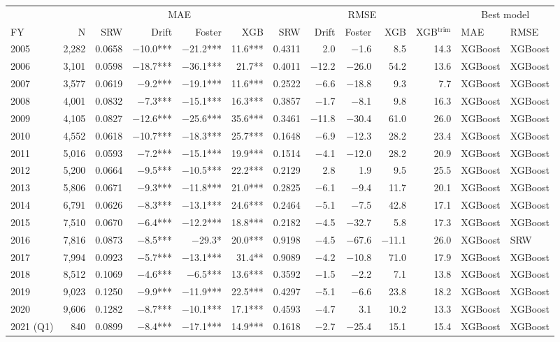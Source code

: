 \begin{tabular}{lrr rrr r rrr r ll}
\toprule
& & \multicolumn{4}{c}{MAE} & \multicolumn{5}{c}{RMSE} & \multicolumn{2}{c}{Best model} \\
\cmidrule(lr){3-6}\cmidrule(lr){7-11}\cmidrule(lr){12-13}
FY & N & SRW & Drift & Foster & XGB & SRW & Drift & Foster & XGB & XGB$^{\text{trim}}$ & MAE & RMSE \\
\midrule
2005 & 2,282 & 0.0658 & $-$10.0*** & $-$21.2*** & 11.6*** & 0.4311 & 2.0 & $-$1.6 & 8.5 & 14.3 & XGBoost & XGBoost \\
2006 & 3,101 & 0.0598 & $-$18.7*** & $-$36.1*** & 21.7** & 0.4011 & $-$12.2 & $-$26.0 & 54.2 & 13.6 & XGBoost & XGBoost \\
2007 & 3,577 & 0.0619 & $-$9.2*** & $-$19.1*** & 11.6*** & 0.2522 & $-$6.6 & $-$18.8 & 9.3 & 7.7 & XGBoost & XGBoost \\
2008 & 4,001 & 0.0832 & $-$7.3*** & $-$15.1*** & 16.3*** & 0.3857 & $-$1.7 & $-$8.1 & 9.8 & 16.3 & XGBoost & XGBoost \\
2009 & 4,105 & 0.0827 & $-$12.6*** & $-$25.6*** & 35.6*** & 0.3461 & $-$11.8 & $-$30.4 & 61.0 & 26.0 & XGBoost & XGBoost \\
2010 & 4,552 & 0.0618 & $-$10.7*** & $-$18.3*** & 25.7*** & 0.1648 & $-$6.9 & $-$12.3 & 28.2 & 23.4 & XGBoost & XGBoost \\
2011 & 5,016 & 0.0593 & $-$7.2*** & $-$15.1*** & 19.9*** & 0.1514 & $-$4.1 & $-$12.0 & 28.2 & 20.9 & XGBoost & XGBoost \\
2012 & 5,200 & 0.0664 & $-$9.5*** & $-$10.5*** & 22.2*** & 0.2129 & 2.8 & 1.9 & 9.5 & 25.5 & XGBoost & XGBoost \\
2013 & 5,806 & 0.0671 & $-$9.3*** & $-$11.8*** & 21.0*** & 0.2825 & $-$6.1 & $-$9.4 & 11.7 & 20.1 & XGBoost & XGBoost \\
2014 & 6,791 & 0.0626 & $-$8.3*** & $-$13.1*** & 24.6*** & 0.2464 & $-$5.1 & $-$7.5 & 42.8 & 17.1 & XGBoost & XGBoost \\
2015 & 7,510 & 0.0670 & $-$6.4*** & $-$12.2*** & 18.8*** & 0.2182 & $-$4.5 & $-$32.7 & 5.8 & 17.3 & XGBoost & XGBoost \\
2016 & 7,816 & 0.0873 & $-$8.5*** & $-$29.3* & 20.0*** & 0.9198 & $-$4.5 & $-$67.6 & $-$11.1 & 26.0 & XGBoost & SRW \\
2017 & 7,994 & 0.0923 & $-$5.7*** & $-$13.1*** & 31.4** & 0.9089 & $-$4.2 & $-$10.8 & 71.0 & 17.9 & XGBoost & XGBoost \\
2018 & 8,512 & 0.1069 & $-$4.6*** & $-$6.5*** & 13.6*** & 0.3592 & $-$1.5 & $-$2.2 & 7.1 & 13.8 & XGBoost & XGBoost \\
2019 & 9,023 & 0.1250 & $-$9.9*** & $-$11.9*** & 22.5*** & 0.4297 & $-$5.1 & $-$6.6 & 23.8 & 18.2 & XGBoost & XGBoost \\
2020 & 9,606 & 0.1282 & $-$8.7*** & $-$10.1*** & 17.1*** & 0.4593 & $-$4.7 & 3.1 & 10.2 & 13.3 & XGBoost & XGBoost \\
2021 (Q1) & 840 & 0.0899 & $-$8.4*** & $-$17.1*** & 14.9*** & 0.1618 & $-$2.7 & $-$25.4 & 15.1 & 15.4 & XGBoost & XGBoost \\
\bottomrule
\end{tabular}
